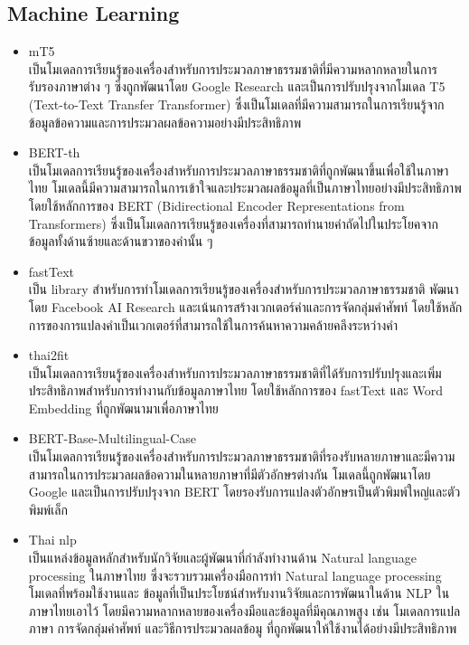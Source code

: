 \documentclass[14pt,oneside,openright,a4paper]{cpe-thai-project}
\begin{document}
  \subsection{Machine Learning}
    \begin{itemize}
      \item mT5 \\
        เป็นโมเดลการเรียนรู้ของเครื่องสำหรับการประมวลภาษาธรรมชาติที่มีความหลากหลายในการรับรองภาษาต่าง  ๆ ซึ่งถูกพัฒนาโดย Google Research และเป็นการปรับปรุงจากโมเดล T5 (Text-to-Text Transfer Transformer) ซึ่งเป็นโมเดลที่มีความสามารถในการเรียนรู้จากข้อมูลข้อความและการประมวลผลข้อความอย่างมีประสิทธิภาพ
      \item BERT-th  \\
        เป็นโมเดลการเรียนรู้ของเครื่องสำหรับการประมวลภาษาธรรมชาติที่ถูกพัฒนาขึ้นเพื่อใช้ในภาษาไทย โมเดลนี้มีความสามารถในการเข้าใจและประมวลผลข้อมูลที่เป็นภาษาไทยอย่างมีประสิทธิภาพ โดยใช้หลักการของ BERT (Bidirectional Encoder Representations from Transformers) ซึ่งเป็นโมเดลการเรียนรู้ของเครื่องที่สามารถทำนายคำถัดไปในประโยคจากข้อมูลทั้งด้านซ้ายและด้านขวาของคำนั้น ๆ
      \item fastText \\
        เป็น library สำหรับการทำโมเดลการเรียนรู้ของเครื่องสำหรับการประมวลภาษาธรรมชาติ พัฒนาโดย Facebook AI Research และเน้นการสร้างเวกเตอร์คำและการจัดกลุ่มคำศัพท์ โดยใช้หลักการของการแปลงคำเป็นเวกเตอร์ที่สามารถใช้ในการค้นหาความคล้ายคลึงระหว่างคำ
      \item thai2fit \\
        เป็นโมเดลการเรียนรู้ของเครื่องสำหรับการประมวลภาษาธรรมชาติที่ได้รับการปรับปรุงและเพิ่มประสิทธิภาพสำหรับการทำงานกับข้อมูลภาษาไทย โดยใช้หลักการของ fastText และ Word Embedding ที่ถูกพัฒนามาเพื่อภาษาไทย 
      \item BERT-Base-Multilingual-Case \\
        เป็นโมเดลการเรียนรู้ของเครื่องสำหรับการประมวลภาษาธรรมชาติที่รองรับหลายภาษาและมีความสามารถในการประมวลผลข้อความในหลายภาษาที่มีตัวอักษรต่างกัน โมเดลนี้ถูกพัฒนาโดย Google และเป็นการปรับปรุงจาก BERT โดยรองรับการแปลงตัวอักษรเป็นตัวพิมพ์ใหญ่และตัวพิมพ์เล็ก
      \item Thai nlp \\
        เป็นแหล่งข้อมูลหลักสำหรับนักวิจัยและผู้พัฒนาที่กำลังทำงานด้าน Natural language processing ในภาษาไทย ซึ่งจะรวบรวมเครื่องมือการทำ Natural language processing  โมเดลที่พร้อมใช้งานและ ข้อมูลที่เป็นประโยชน์สำหรับงานวิจัยและการพัฒนาในด้าน NLP ในภาษาไทยเอาไว้ โดยมีความหลากหลายของเครื่องมือและข้อมูลที่มีคุณภาพสูง เช่น โมเดลการแปลภาษา การจัดกลุ่มคำศัพท์ และวิธีการประมวลผลข้อมู ที่ถูกพัฒนาให้ใช้งานได้อย่างมีประสิทธิภาพ
    \end{itemize}
\end{document}
